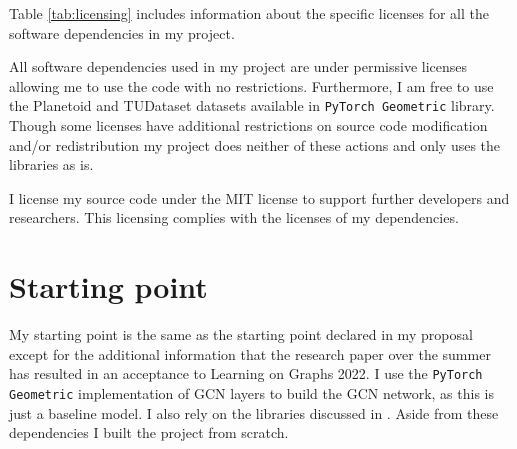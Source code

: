 Table \ref{tab:licensing} includes information about the specific licenses for all the software dependencies in my project.

All software dependencies used in my project are under permissive licenses allowing me to use the code with no restrictions.
Furthermore, I am free to use the Planetoid  and TUDataset \cite{Morris+2020} datasets available in \texttt{PyTorch Geometric} library.
Though some licenses have additional restrictions on source code modification and/or redistribution my project does neither of these actions and only uses the libraries as is.

I license my source code under the MIT license to support further developers and researchers.
This licensing complies with the licenses of my dependencies.


\section{Starting point}

My starting point is the same as the starting point declared in my proposal except for the additional information that the research paper over the summer has resulted in an acceptance to Learning on Graphs 2022.
I use the \texttt{PyTorch Geometric} implementation of GCN layers to build the GCN network, as this is just a baseline model. I also rely on the libraries discussed in .
Aside from these dependencies I built the project from scratch.

